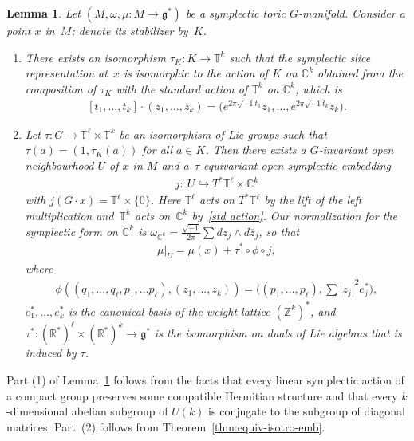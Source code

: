\documentclass[10pt,a4paper]{amsart}
\numberwithin{equation}{section}
\newtheorem{Lemma}{Lemma}[section]
\begin{document}
\begin{Lemma}\label{lem:2.6}
Let $(M,\omega, \mu \colon M \to {\mathfrak g}^*)$ be a symplectic toric $G$-manifold.
Consider a point $x$ in~$M$; denote its stabilizer by~$K$.
\begin{enumerate}[$1.$]\itemsep=0pt
\item
There exists an isomorphism $\tau_K \colon K \to {\mathbb T}^k$
such that the symplectic slice representation at~$x$
is isomorphic to the action of $K$ on ${\mathbb C}^k$ obtained from
the composition of $\tau_K$
with the standard action of ${\mathbb T}^k$ on ${\mathbb C}^k$,
which is
\begin{gather} \label{std action}
[t_1,\ldots, t_k]\cdot (z_1,\ldots, z_k) =
\big(e^{2\pi\sqrt{-1} t_1} z_1,\ldots, e^{2\pi\sqrt{-1} t_k} z_k\big).
\end{gather}

\item
Let $\tau \colon G \to {\mathbb T}^\ell \times {\mathbb T}^k$ be an isomorphism
of Lie groups such that $\tau(a) = (1,\tau_K(a))$ for all $a \in K$.
Then there exists a $G$-invariant open neighbourhood $U$
of $x$ in $M$
and a~$\tau$-equivariant open symplectic embedding
\begin{gather*}
j \colon \ U \hookrightarrow T^*{\mathbb T}^\ell \times {\mathbb C}^k
\end{gather*}
with $j(G\cdot x) = {\mathbb T}^\ell \times \{0\}$.  Here ${\mathbb T}^\ell $ acts on $
T^*{\mathbb T}^\ell$ by the lift of the left multiplication
and~${\mathbb T}^k$ acts on~${\mathbb C}^k$ by~\eqref{std action}.
Our normalization for
the symplectic form on ${\mathbb C}^k$ is
$\omega_{{\mathbb C}^k} = \frac{\sqrt{-1}}{2\pi} \sum dz_j \wedge d\overline{z}_j$,
so that
\begin{gather} \label{moment}
\mu|_U = \mu(x) + \tau^* \circ \phi \circ j,
\end{gather}
where
\begin{gather*}
\phi ((q_1, \ldots, q_\ell, p_1, \ldots p_\ell), (z_1,\ldots, z_k))
=   \Big(   (p_1,\ldots, p_\ell)   ,   \sum |z_j|^2 e_j^*   \Big)  ,
\end{gather*}
$e_1^*,\ldots,e_k^*$ is the canonical basis
of the weight lattice $({\mathbb Z}^k)^*$,
and $\tau^* \colon ({\mathbb R}^*)^\ell \times ({\mathbb R}^*)^k \to {\mathfrak g}^*$
is the isomorphism on duals of Lie algebras that is induced by $\tau$.
\end{enumerate}
\end{Lemma}

Part (1) of Lemma~\ref{lem:2.6} follows from the facts that every
linear symplectic action of a compact group preserves some compatible
Hermitian structure and that every $k$-dimensional abelian subgroup of
$U(k)$ is conjugate to the subgroup of diagonal matrices.
Part~(2) follows from Theorem~\ref{thm:equiv-isotro-emb}.
\end{document}
